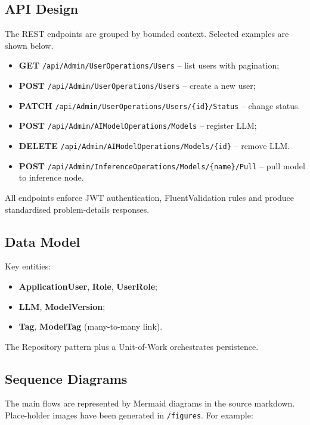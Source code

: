 \subsection{API Design}
The REST endpoints are grouped by bounded context.  Selected examples are shown below.
\begin{itemize}
  \item \textbf{GET} \texttt{/api/Admin/UserOperations/Users} – list users with pagination;
  \item \textbf{POST} \texttt{/api/Admin/UserOperations/Users} – create a new user;
  \item \textbf{PATCH} \texttt{/api/Admin/UserOperations/Users/\{id\}/Status} – change status.
  \item \textbf{POST} \texttt{/api/Admin/AIModelOperations/Models} – register LLM;
  \item \textbf{DELETE} \texttt{/api/Admin/AIModelOperations/Models/\{id\}} – remove LLM.
  \item \textbf{POST} \texttt{/api/Admin/InferenceOperations/Models/\{name\}/Pull} – pull model to inference node.
\end{itemize}
All endpoints enforce JWT authentication, FluentValidation rules and produce standardised problem-details responses.

\subsection{Data Model}
Key entities:
\begin{itemize}
  \item \textbf{ApplicationUser}, \textbf{Role}, \textbf{UserRole};
  \item \textbf{LLM}, \textbf{ModelVersion};
  \item \textbf{Tag}, \textbf{ModelTag} (many-to-many link).
\end{itemize}
The Repository pattern plus a Unit-of-Work orchestrates persistence.

\subsection{Sequence Diagrams}
The main flows are represented by Mermaid diagrams in the source markdown.  Place-holder images have been generated in \texttt{\chapdir/figures}.  For example:

